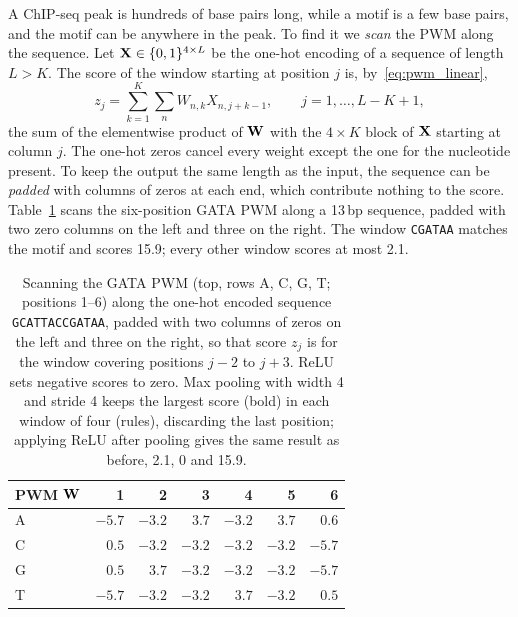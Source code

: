 A ChIP-seq peak is hundreds of base pairs long, while a motif is a few base pairs, and the motif can be anywhere in the peak. To find it we \emph{scan} the PWM along the sequence. Let $\mathbf{X}\in\{0,1\}^{4\times L}$ be the one-hot encoding of a sequence of length $L>K$. The score of the window starting at position $j$ is, by~\eqref{eq:pwm_linear},
\begin{equation}
  z_j = \sum_{k=1}^{K}\sum_{n}W_{n,k}X_{n,j+k-1}, \qquad j=1,\dots,L-K+1 ,
  \label{eq:scan}
\end{equation}
the sum of the elementwise product of $\mathbf{W}$ with the $4\times K$ block of $\mathbf{X}$ starting at column $j$. The one-hot zeros cancel every weight except the one for the nucleotide present. To keep the output the same length as the input, the sequence can be \emph{padded} with columns of zeros at each end, which contribute nothing to the score. Table~\ref{tab:pwm_scan} scans the six-position GATA PWM along a 13\,bp sequence, padded with two zero columns on the left and three on the right. The window \texttt{CGATAA} matches the motif and scores 15.9; every other window scores at most 2.1.

\begin{table}[t]
  \centering
  \caption{Scanning the GATA PWM (top, rows A, C, G, T; positions 1--6) along the one-hot encoded sequence \texttt{GCATTACCGATAA}, padded with two columns of zeros on the left and three on the right, so that score $z_j$ is for the window covering positions $j-2$ to $j+3$. ReLU sets negative scores to zero. Max pooling with width 4 and stride 4 keeps the largest score (bold) in each window of four (rules), discarding the last position; applying ReLU after pooling gives the same result as before, 2.1, 0 and 15.9.}
  \label{tab:pwm_scan}
  \small
  \begin{tabular}{l*{6}{r}}
    \toprule
    PWM $\mathbf{W}$ & 1 & 2 & 3 & 4 & 5 & 6 \\
    \midrule
    A & $-5.7$ & $-3.2$ & $3.7$ & $-3.2$ & $3.7$ & $0.6$ \\
    C & $0.5$ & $-3.2$ & $-3.2$ & $-3.2$ & $-3.2$ & $-5.7$ \\
    G & $0.5$ & $3.7$ & $-3.2$ & $-3.2$ & $-3.2$ & $-5.7$ \\
    T & $-5.7$ & $-3.2$ & $-3.2$ & $3.7$ & $-3.2$ & $0.5$ \\
    \bottomrule
  \end{tabular}\\[1em]
  \setlength{\tabcolsep}{3.5pt}
  
\end{table}

